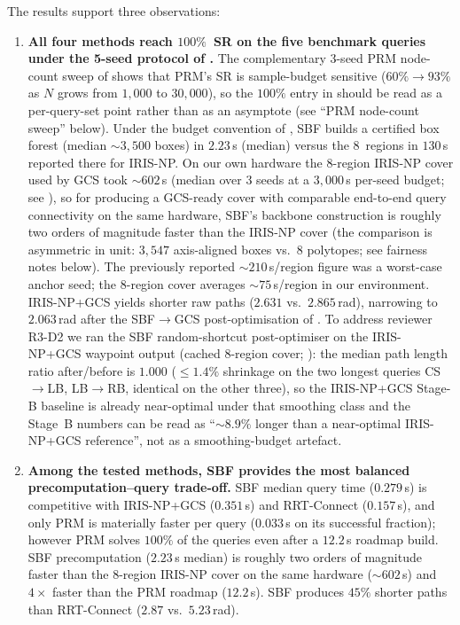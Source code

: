 \documentclass[journal]{IEEEtran}
\begin{document}
The results support three observations:
\begin{enumerate}
  \item \textbf{All four methods reach $100\%$~SR on the five
    benchmark queries under the 5-seed protocol of
    .}
    The complementary 3-seed PRM node-count sweep of
     shows that PRM's SR is sample-budget sensitive
    ($60\%\!\to\!93\%$ as $N$ grows from $1{,}000$ to $30{,}000$),
    so the $100\%$ entry in  should be read as
    a per-query-set point rather than as an asymptote
    (see ``PRM node-count sweep'' below).
    Under the budget convention of \cite{marcucci2024motion}, SBF
    builds a certified box forest (median ${\sim}3{,}500$ boxes) in
    $2.23$\,s (median) versus the $8$~regions in $130$\,s reported
    there for IRIS-NP. On our own hardware the 8-region IRIS-NP
    cover used by GCS took ${\sim}602$\,s (median over 3 seeds at a
    $3{,}000$\,s per-seed budget; see
    ), so for producing a GCS-ready cover
    with comparable end-to-end query connectivity on the same
    hardware, SBF's backbone construction is roughly two orders of
    magnitude faster than the IRIS-NP cover (the comparison is
    asymmetric in unit: $3{,}547$ axis-aligned boxes vs.\ $8$
    polytopes; see fairness notes below). The previously reported
    ${\sim}210$\,s/region figure was a worst-case anchor seed; the
    8-region cover averages ${\sim}75$\,s/region in our environment.
    IRIS-NP+GCS yields shorter raw paths
    ($2.631$ vs.\ $2.865$\,rad), narrowing to $2.063$\,rad after the
    SBF$\to$GCS post-optimisation of .
    To address reviewer R3-D2 we ran the SBF random-shortcut
    post-optimiser on the IRIS-NP+GCS waypoint output (cached
    8-region cover; ): the median path
    length ratio after/before is $1.000$ ($\le 1.4\%$ shrinkage on
    the two longest queries CS$\to$LB, LB$\to$RB, identical on the
    other three), so the IRIS-NP+GCS Stage-B baseline is already
    near-optimal under that smoothing class and the Stage~B numbers
    can be read as ``${\sim}8.9\%$ longer than a near-optimal
    IRIS-NP+GCS reference'', not as a smoothing-budget artefact.

  \item \textbf{Among the tested methods, SBF provides the most
    balanced precomputation--query trade-off.}
    SBF median query time ($0.279$\,s) is competitive with IRIS-NP+GCS
    ($0.351$\,s) and RRT-Connect ($0.157$\,s), and only PRM is
    materially faster per query ($0.033$\,s on its successful
    fraction); however PRM solves $100\%$ of the queries even
    after a $12.2$\,s roadmap build.
    SBF precomputation ($2.23$\,s median) is roughly two orders of
    magnitude faster than the 8-region IRIS-NP cover on the same
    hardware (${\sim}602$\,s) and $4{\times}$ faster than the PRM
    roadmap ($12.2$\,s).
    SBF produces $45\%$ shorter paths than RRT-Connect
    ($2.87$ vs.\ $5.23$\,rad).


\end{enumerate}
\end{document}
